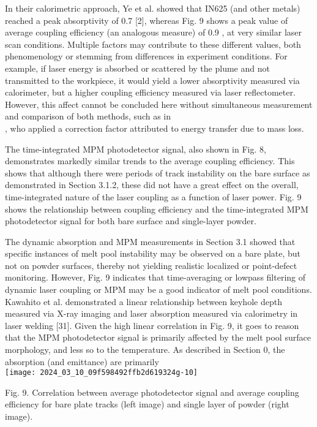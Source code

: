 \documentclass[10pt]{article}
\begin{document}
In their calorimetric approach, Ye et al. showed that IN625 (and other metals) reached a peak absorptivity of 0.7 [2], whereas Fig. 9 shows a peak value of average coupling efficiency (an analogous measure) of 0.9 , at very similar laser scan conditions. Multiple factors may contribute to these different values, both phenomenology or stemming from differences in experiment conditions. For example, if laser energy is absorbed or scattered by the plume and not transmitted to the workpiece, it would yield a lower absorptivity measured via calorimeter, but a higher coupling efficiency measured via laser reflectometer. However, this affect cannot be concluded here without simultaneous measurement and comparison of both methods, such as in\\
[5], who applied a correction factor attributed to energy transfer due to mass loss.

The time-integrated MPM photodetector signal, also shown in Fig. 8, demonstrates markedly similar trends to the average coupling efficiency. This shows that although there were periods of track instability on the bare surface as demonstrated in Section 3.1.2, these did not have a great effect on the overall, time-integrated nature of the laser coupling as a function of laser power. Fig. 9 shows the relationship between coupling efficiency and the time-integrated MPM photodetector signal for both bare surface and single-layer powder.

The dynamic absorption and MPM measurements in Section 3.1 showed that specific instances of melt pool instability may be observed on a bare plate, but not on powder surfaces, thereby not yielding realistic localized or point-defect monitoring. However, Fig. 9 indicates that time-averaging or lowpass filtering of dynamic laser coupling or MPM may be a good indicator of melt pool conditions. Kawahito et al. demonstrated a linear relationship between keyhole depth measured via X-ray imaging and laser absorption measured via calorimetry in laser welding [31]. Given the high linear correlation in Fig. 9, it goes to reason that the MPM photodetector signal is primarily affected by the melt pool surface morphology, and less so to the temperature. As described in Section 0, the absorption (and emittance) are primarily\\
\texttt{[image: 2024\_03\_10\_09f598492ffb2d619324g-10]}

Fig. 9. Correlation between average photodetector signal and average coupling efficiency for bare plate tracks (left image) and single layer of powder (right image).
\end{document}
